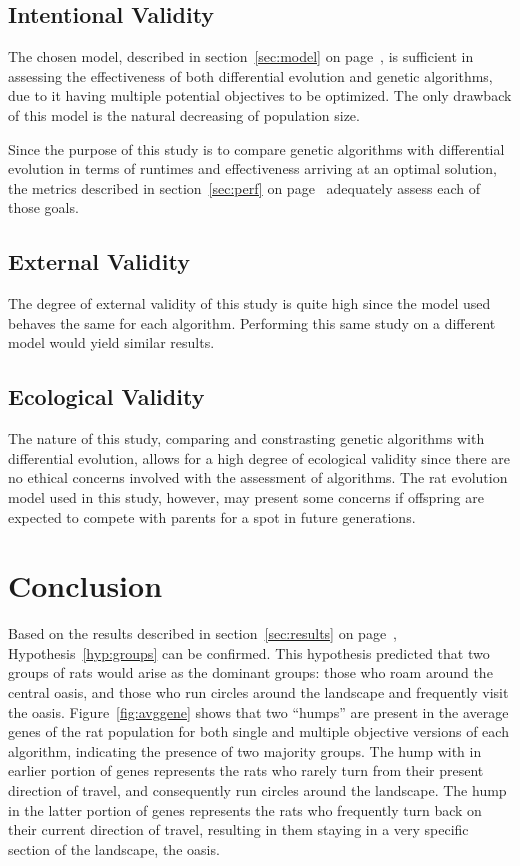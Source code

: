 \documentclass{sig-alternate}
\begin{document}
\subsection{Intentional Validity}
The chosen model, described in section~\ref{sec:model} on page~\pageref{sec:model}, is sufficient in assessing the effectiveness of both differential evolution and genetic algorithms, due to it having multiple potential objectives to be optimized.  The only drawback of this model is the natural decreasing of population size.

Since the purpose of this study is to compare genetic algorithms with differential evolution in terms of runtimes and effectiveness arriving at an optimal solution, the metrics described in section~\ref{sec:perf} on page~\pageref{sec:perf} adequately assess each of those goals.
 
\subsection{External Validity}
The degree of external validity of this study is quite high since the model used behaves the same for each algorithm.  Performing this same study on a different model would yield similar results.

\subsection{Ecological Validity}
The nature of this study, comparing and constrasting genetic algorithms with differential evolution, allows for a high degree of ecological validity since there are no ethical concerns involved with the assessment of algorithms.  The rat evolution model used in this study, however, may present some concerns if offspring are expected to compete with parents for a spot in future generations.

\section{Conclusion}

Based on the results described in section~\ref{sec:results} on page~\pageref{sec:results}, Hypothesis~\ref{hyp:groups} can be confirmed.  This hypothesis predicted that two groups of rats would arise as the dominant groups: those who roam around the central oasis, and those who run circles around the landscape and frequently visit the oasis.  Figure~\ref{fig:avggene} shows that two ``humps'' are present in the average genes of the rat population for both single and multiple objective versions of each algorithm, indicating the presence of two majority groups.  The hump with in earlier portion of genes represents the rats who rarely turn from their present direction of travel, and consequently run circles around the landscape.  The hump in the latter portion of genes represents the rats who frequently turn back on their current direction of travel, resulting in them staying in a very specific section of the landscape, the oasis.
\end{document}
